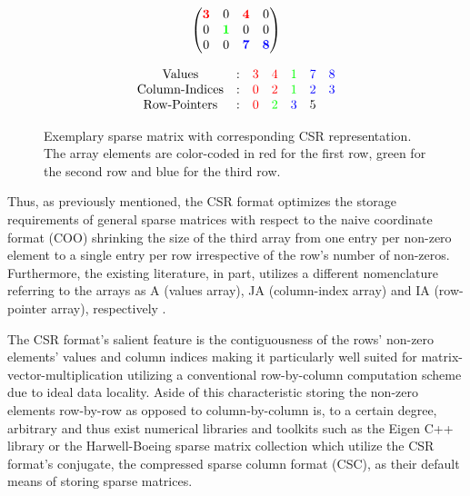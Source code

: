 \documentclass{article}
\begin{document}
    \begin{figure}[ht]
      \centering
      \begin{minipage}{0.4\textwidth}
        \centering
        $$
        \begin{pmatrix}
          \color{red}{\bm{3}} &                     0 &  \color{red}{\bm{4}} &                    0 \\
                            0 & \color{green}{\bm{1}} &                    0 &                    0 \\
                            0 &                     0 & \color{blue}{\bm{7}} & \color{blue}{\bm{8}} \\
        \end{pmatrix}
        $$
      \end{minipage}
      \begin{minipage}{0.4\textwidth}
        \centering
        $$
        \begin{matrix}
          \text{Values}  & : & \color{red}{3} &   \color{red}{4} & \color{green}{1} & \color{blue}{7} & \color{blue}{8} \\
          \text{Column-Indices} & : & \color{red}{0} &   \color{red}{2} & \color{green}{1} & \color{blue}{2} & \color{blue}{3} \\
          \text{Row-Pointers} & : & \color{red}{0} & \color{green}{2} &  \color{blue}{3} &               5 &                 \\
        \end{matrix}
        $$
      \end{minipage}
      \caption{Exemplary sparse matrix with corresponding CSR representation. The array elements are color-coded in red for the first row, green for the second row and blue for the third row.}
      \label{fig:csr_example}
    \end{figure}

    Thus, as previously mentioned, the CSR format optimizes the storage requirements of general sparse matrices with respect to the naive coordinate format (COO) shrinking the size of the third array from one entry per non-zero element to a single entry per row irrespective of the row's number of non-zeros. Furthermore, the existing literature, in part, utilizes a different nomenclature referring to the arrays as A (values array), JA (column-index array) and IA (row-pointer array), respectively \cite{sparskit}.

    The CSR format's salient feature is the contiguousness of the rows' non-zero elements' values and column indices making it particularly well suited for matrix-vector-multiplication utilizing a conventional row-by-column computation scheme due to ideal data locality. Aside of this characteristic storing the non-zero elements row-by-row as opposed to column-by-column is, to a certain degree, arbitrary and thus exist numerical libraries and toolkits such as the Eigen C++ library \cite{eigen:website} or the Harwell-Boeing sparse matrix collection \cite{harwell-boeing} which utilize the CSR format's conjugate, the compressed sparse column format (CSC), as their default means of storing sparse matrices.
\end{document}
